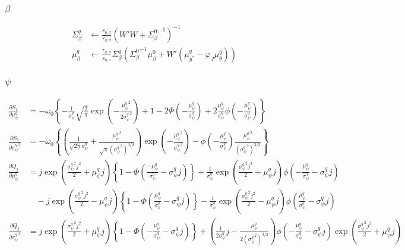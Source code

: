 \documentclass[11pt]{article}
\begin{document}
\subsubsection{$\beta$}
\begin{align*}
  \Sigma_{\beta}^{q} &\leftarrow \frac{s_{q,\sigma}}{r_{q,\sigma}}\left(W'W + {\Sigma_{\beta}^{0}}^{-1}\right)^{-1}\\
  \mu_{\beta}^{q} &\leftarrow \frac{r_{q,\sigma}}{s_{q,\sigma}}\Sigma_{\beta}^{q}\left({\Sigma_{\beta}^{0}}^{-1}\mu_{\beta}^{0}+W'\left(\mu_{y^*}^{q}-\varphi_{J}\mu_{\theta}^{q}\right)\right)
\end{align*}
\subsubsection{$\psi$}
\begin{align*}
  \frac{\partial S_{1}}{\partial \mu_{\psi}^{q}} &= -\omega_{0}\left\{-\frac{1}{\sigma_{\psi}^{q}}\sqrt{\frac{2}{\pi}}\exp\left(-\frac{{\mu_{\psi}^{q}}^{2}}{2{\sigma_{\psi}^{q}}^{2}} \right) + 1 -2\Phi\left(-\frac{\mu_{\psi}^{q}}{\sigma_{\psi}^{q}}\right)+2\frac{\mu_{\psi}^{q}}{\sigma_{\psi}^{q}}\phi\left(-\frac{\mu_{\psi}^{q}}{\sigma_{\psi}^{q}}\right) \right\}\\
  \frac{\partial S_{1}}{\partial {\sigma_{\psi}^{q}}^{2}} &= -\omega_{0}\left\{\left(\frac{1}{\sqrt{2\pi}\sigma_{\psi}^{q}}+\frac{{\mu_{\psi}^{q}}^{2}}{\sqrt{\pi}\left({\sigma_{\psi}^{q}}^{2} \right)^{3/2}} \right)\exp\left(-\frac{{\mu_{\psi}^{q}}^{2}}{{\sigma_{\psi}^{q}}^{2}} \right) -\phi\left(-\frac{\mu_{\psi}^{q}}{\sigma_{\psi}^{q}}\right)\frac{{\mu_{\psi}^{q}}^{2}}{\left({\sigma_{\psi}^{q}}^{2} \right)^{3/2}} \right\}\\
  \frac{\partial Q_{j}}{\partial \mu_{\psi}^{q}} &= j\exp\left(\frac{{\sigma_{\psi}^{q}}^{2}j^{2}}{2} +\mu_{\psi}^{q}j \right)\left\{1-\Phi\left(\frac{-\mu_{\psi}^{q}}{\sigma_{\psi}^{q}}-\sigma_{\psi}^{q}j\right) \right\}+\frac{1}{\sigma_{\psi}^{q}}\exp\left(\frac{{\sigma_{\psi}^{q}}^{2}j^{2}}{2}+\mu_{\psi}^{q}j \right)\phi\left(-\frac{\mu_{\psi}^{q}}{\sigma_{\psi}^{q}}-\sigma_{\psi}^{q}j\right)\\
  &\quad -j\exp\left(\frac{{\sigma_{\psi}^{q}}^{2}j^{2}}{2} -\mu_{\psi}^{q}j \right)\left\{1-\Phi\left(\frac{\mu_{\psi}^{q}}{\sigma_{\psi}^{q}}-\sigma_{\psi}^{q}j\right) \right\}-\frac{1}{\sigma_{\psi}^{q}}\exp\left(\frac{{\sigma_{\psi}^{q}}^{2}j^{2}}{2}-\mu_{\psi}^{q}j \right)\phi\left(\frac{\mu_{\psi}^{q}}{\sigma_{\psi}^{q}}-\sigma_{\psi}^{q}j\right)\\
  \frac{\partial Q_{j}}{\partial {\sigma_{\psi}^{q}}^{2}} &= j\exp\left(\frac{{\sigma_{\psi}^{q}}^{2}j^{2}}{2}+\mu_{\psi}^{q}j \right)\left\{1-\Phi\left(-\frac{\mu_{\psi}^{q}}{\sigma_{\psi}^{q}}-\sigma_{\psi}^{q}j\right) \right\}+\left(\frac{1}{2\sigma_{\psi}^{q}}j -\frac{\mu_{\psi}^{q}}{2\left({\sigma_{\psi}^{q}}^{2} \right)^{3/2}}\right)\phi\left(-\frac{\mu_{\psi}^{q}}{\sigma_{\psi}^{q}}-\sigma_{\psi}^{q}j\right)\exp\left(\frac{{\sigma_{\psi}^{q}}^{2}j^{2}}{2} +\mu_{\psi}^{q}j \right)\\

\end{align*}
\end{document}
